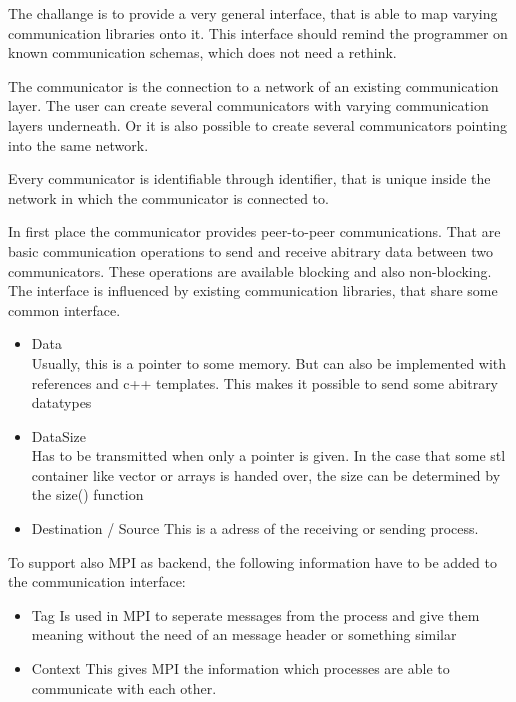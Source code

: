 The challange is to provide a very general interface, that is able to
map varying communication libraries onto it. This interface should
remind the programmer on known communication schemas, which does not
need a rethink.

The communicator is the connection to a network of an existing
communication layer. The user can create several communicators with
varying communication layers underneath. Or it is also possible to
create several communicators pointing into the same network.

Every communicator is identifiable through identifier, that is unique
inside the network in which the communicator is connected to.

In first place the communicator provides peer-to-peer
communications. That are basic communication operations to send and
receive abitrary data between two communicators. These operations are
available blocking and also non-blocking.  The interface is influenced
by existing communication libraries, that share some common interface.

\begin{itemize}
  \item Data \\ Usually, this is a pointer to some memory.  But can
    also be implemented with references and c++ templates.  This makes
    it possible to send some abitrary datatypes
  \item DataSize\\ Has to be transmitted when only a pointer is
    given. In the case that some stl container like vector or arrays
    is handed over, the size can be determined by the size() function
  \item Destination / Source This is a adress of the receiving or
    sending process.
    
\end{itemize}

To support also MPI as backend, the following information have to be
added to the communication interface:

\begin{itemize}
  \item Tag Is used in MPI to seperate messages from the process and
    give them meaning without the need of an message header or
    something similar
  \item Context This gives MPI the information which processes are
    able to communicate with each other.
    
\end{itemize}

